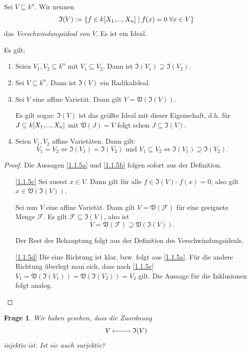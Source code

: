 \documentclass[a4paper,12pt]{scrbook}
\theoremstyle{keinenummern} %
\newtheorem{q}{Frage}
\theoremstyle{mitnummern}
\theoremstyle{unserbeweis}
\newtheorem{proof}{Beweis}
\def\V{\mathfrak{V}}
\def\I{\mathfrak{I}}
\newcommand{\F}{\mathcal{F}}
\renewcommand{\dotsc}{\ensuremath{\!...}}
\renewcommand{\mapsto}{\raisebox{-1pt}{\tikz{\draw[thin,shorten >=3pt, |->] (0,0) node{\hspace*{0pt}} -- node{} (1,0);}}\penalty1000\relax}
\newcommand{\polyx}[1][n]{\ensuremath%
  [X_{1},\dotsc,X_{#1}]}
\begin{document}
\begin{db}
Sei $V\subseteq k^{n}$. Wir nennen
\[\I(V):=\{f\in k\polyx\mid f(x)=0\;\forall x\in V\}\]
das \emph{Verschwindungsideal von $V$}. Es ist ein Ideal.
\end{db}

\begin{bem}\label{1.1.5} Es gilt:
\begin{enumerate}
\item{} Seien $V_{1},V_{2}\subseteq k^{n}$ mit $V_{1}\subseteq V_{2}$. Dann ist $\I(V_{1})\supseteq \I(V_{2})$.
\item{} Sei $V\subseteq k^{n}$. Dann ist $\I(V)$ ein Radikalideal.
\item{} Sei $V$ eine affine Varietät. Dann gilt $V=\V(\I(V))$.

Es gilt sogar: $\I(V)$ ist das größte Ideal mit dieser Eigenschaft, d.h. für $J\subseteq k\polyx$ mit $\V(J)=V$ folgt schon $J\subseteq \I(V)$.
\item{} Seien $V_{1},V_{2}$ affine Varietäten. Dann gilt:
\[V_{1}=V_{2}\iff \I(V_{1})=\I(V_{2})\text{ und } V_{1}\subseteq V_{2}\iff \I(V_{1})\supseteq \I(V_{2}).\]
\end{enumerate}
\end{bem}

\begin{proof} Die Aussagen \ref{1.1.5a} und \ref{1.1.5b} folgen sofort aus der Definition.
\begin{enumerate}
\item[\ref{1.1.5c}] Sei zuerst $x\in V$. Dann gilt für alle $f\in \I(V)$: $f(x)=0$, also gilt $x\in \V(\I(V))$.

Sei nun $V$ eine affine Varietät. Dann gilt $V=\V(\F)$ für eine geeignete Menge $\F$. Es gilt $\F\subseteq \I(V)$, also ist
\[V=\V(\F)\supseteq \V(\I(V)).\]

Der Rest der Behauptung folgt aus der Definition des Verschwindungsideals.
\item[\ref{1.1.5d}] Die eine Richtung ist klar, bzw. folgt aus \ref{1.1.5a}. Für die andere Richtung überlegt man sich, dass nach \ref{1.1.5c} $V_{1}=\V(\I(V_{1}))=\V(\I(V_{2}))=V_{2}$ gilt.  Die Aussage für die Inklusionen folgt analog.
\end{enumerate}
\end{proof}

\begin{q}
Wir haben gesehen, dass die Zuordnung
\[V\mapsto \I(V)\]
injektiv ist. Ist sie auch surjektiv?
\end{q}
\end{document}
